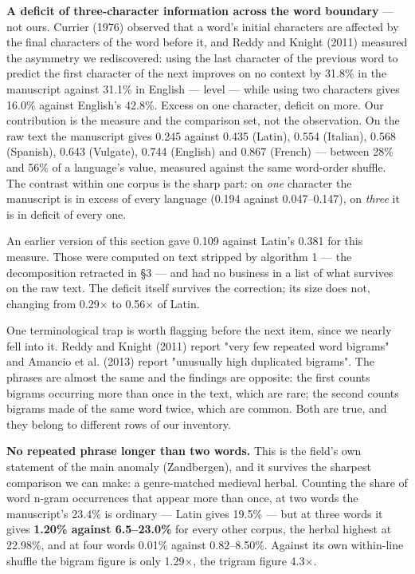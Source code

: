 \documentclass[11pt,a4paper]{article}
\begin{document}
\textbf{A deficit of three-character information across the word boundary} --- not ours. Currier (1976) observed that a word's initial characters are affected by the final characters of the word before it, and Reddy and Knight (2011) measured the asymmetry we rediscovered: using the last character of the previous word to predict the first character of the next improves on no context by 31.8\% in the manuscript against 31.1\% in English --- level --- while using two characters gives 16.0\% against English's 42.8\%. Excess on one character, deficit on more. Our contribution is the measure and the comparison set, not the observation. On the raw text the manuscript gives 0.245 against 0.435 (Latin), 0.554 (Italian), 0.568 (Spanish), 0.643 (Vulgate), 0.744 (English) and 0.867 (French) --- between 28\% and 56\% of a language's value, measured against the same word-order shuffle. The contrast within one corpus is the sharp part: on \emph{one} character the manuscript is in excess of every language (0.194 against 0.047--0.147), on \emph{three} it is in deficit of every one.


An earlier version of this section gave 0.109 against Latin's 0.381 for this measure. Those were computed on text stripped by algorithm 1 --- the decomposition retracted in \S3 --- and had no business in a list of what survives on the raw text. The deficit itself survives the correction; its size does not, changing from 0.29$\times$ to 0.56$\times$ of Latin.


One terminological trap is worth flagging before the next item, since we nearly fell into it. Reddy and Knight (2011) report "very few repeated word bigrams" and Amancio et al. (2013) report "unusually high duplicated bigrams". The phrases are almost the same and the findings are opposite: the first counts bigrams occurring more than once in the text, which are rare; the second counts bigrams made of the same word twice, which are common. Both are true, and they belong to different rows of our inventory.


\textbf{No repeated phrase longer than two words.} This is the field's own statement of the main anomaly (Zandbergen), and it survives the sharpest comparison we can make: a genre-matched medieval herbal. Counting the share of word n-gram occurrences that appear more than once, at two words the manuscript's 23.4\% is ordinary --- Latin gives 19.5\% --- but at three words it gives \textbf{1.20\% against 6.5--23.0\%} for every other corpus, the herbal highest at 22.98\%, and at four words 0.01\% against 0.82--8.50\%. Against its own within-line shuffle the bigram figure is only 1.29$\times$, the trigram figure 4.3$\times$.
\end{document}

